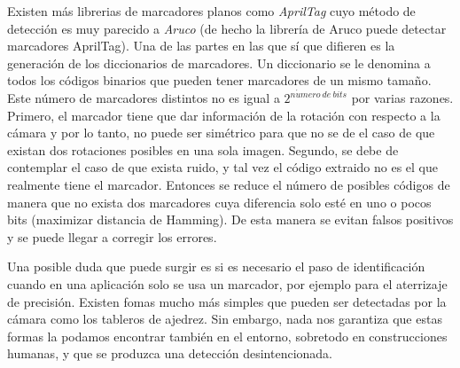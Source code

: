 Existen más librerias de marcadores planos como \textit{AprilTag} cuyo método de detección es muy parecido a \textit{Aruco} (de hecho la librería de Aruco puede detectar marcadores AprilTag). Una de las partes en las que sí que difieren es la generación de los diccionarios de marcadores. Un diccionario se le denomina a todos los códigos binarios que pueden tener marcadores de un mismo tamaño. Este número de marcadores distintos no es igual a $2^{n\acute{u}mero\ de\ bits}$ por varias razones. Primero, el marcador tiene que dar información de la rotación con respecto a la cámara y por lo tanto, no puede ser simétrico para que no se de el caso de que existan dos rotaciones posibles en una sola imagen. Segundo, se debe de contemplar el caso de que exista ruido, y tal vez el código extraido no es el que realmente tiene el marcador. Entonces se reduce el número de posibles códigos de manera que no exista dos marcadores cuya diferencia solo esté en uno o pocos bits (maximizar distancia de Hamming). De esta manera se evitan falsos positivos y se puede llegar a corregir los errores. 

Una posible duda que puede surgir es si es necesario el paso de identificación cuando en una aplicación solo se usa un marcador, por ejemplo para el aterrizaje de precisión. Existen fomas mucho más simples que pueden ser detectadas por la cámara como los tableros de ajedrez. Sin embargo, nada nos garantiza que estas formas la podamos encontrar también en el entorno, sobretodo en construcciones humanas, y que se produzca una detección desintencionada.

